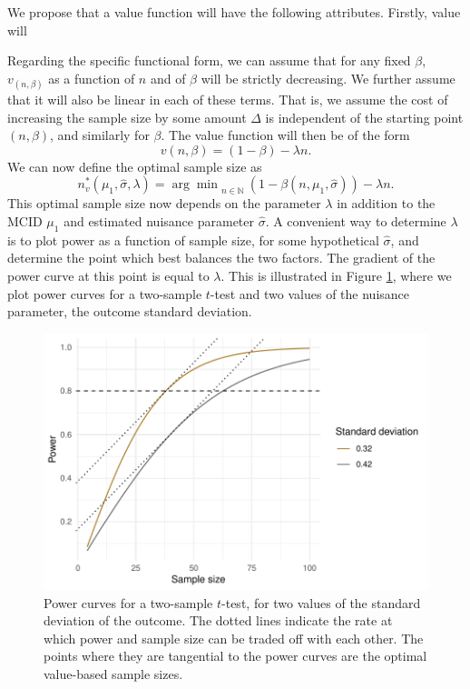 \documentclass[sagev, Crown]{sagej}
\begin{document}
We propose that a value function will have the following attributes. Firstly, value will 

Regarding the specific functional form, we can assume that for any fixed $\beta$, $v_(n, \beta)$ as a function of $n$ and of $\beta$ will be strictly decreasing. We further assume that it will also be linear in each of these terms. That is, we assume the cost of increasing the sample size by some amount $\Delta$ is independent of the starting point $(n, \beta)$, and similarly for $\beta$. The value function will then be of the form
$$
v(n, \beta) = (1 - \beta) - \lambda n.
$$
We can now define the optimal sample size as
\begin{equation}
n^*_v (\mu_1, \hat{\sigma}, \lambda) = {\arg\min}_{n \in \mathbb{N}} ~ (1 - \beta(n, \mu_1, \hat{\sigma})) - \lambda n.
\end{equation}
This optimal sample size now depends on the parameter $\lambda$ in addition to the MCID $\mu_1$ and estimated nuisance parameter $\hat{\sigma}$. A convenient way to determine $\lambda$ is to plot power as a function of sample size, for some hypothetical $\hat{\sigma}$, and determine the point which best balances the two factors. The gradient of the power curve at this point is equal to $\lambda$. This is illustrated in Figure \ref{fig:p_curves}, where we plot power curves for a two-sample $t$-test and two values of the nuisance parameter, the outcome standard deviation. 

\begin{figure}
\centering
\includegraphics[scale=0.8]{./figures/p_curves}
\caption{Power curves for a two-sample $t$-test, for two values of the standard deviation of the outcome. The dotted lines indicate the rate at which power and sample size can be traded off with each other. The points where they are tangential to the power curves are the optimal value-based sample sizes.}
\label{fig:p_curves}
\end{figure}
\end{document}
